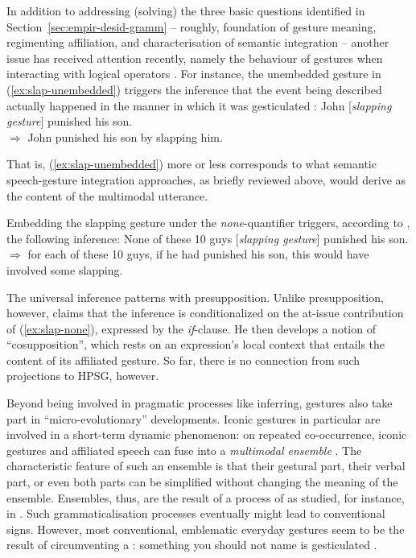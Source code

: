 \documentclass[output=paper
                ,modfonts
                ,nonflat
	        ,collection
	        ,collectionchapter
	        ,collectiontoclongg
 	        ,biblatex
                ,babelshorthands
                ,newtxmath
                ,draftmode
                ,colorlinks, citecolor=brown
]{./langsci/langscibook}
\begin{document}
In addition to addressing (solving) the three basic questions identified in Section~\ref{sec:empir-desid-gramm} -- roughly, foundation of gesture meaning, regimenting affiliation, and characterisation of semantic integration -- another issue has received attention recently, namely the  behaviour of gestures when interacting with logical operators \citep{Ebert:2014:a,Schlenker:2018}.
%
For instance, the unembedded gesture in (\ref{ex:slap-unembedded}) triggers the inference that the event being described actually happened in the manner in which it was gesticulated \citep[]{Schlenker:2018}:
%
\ea \label{ex:slap-unembedded}
John [\textit{slapping gesture}] punished his son. \\
$\Rightarrow$ John punished his son by slapping him.
\z

That is, (\ref{ex:slap-unembedded}) more or less corresponds to what semantic speech-gesture integration approaches, as briefly reviewed above, would derive as the content of the multimodal utterance.

Embedding the slapping gesture under the \textit{none}-quantifier triggers, according to \citet[]{Schlenker:2018}, the following inference:
%
\ea \label{ex:slap-none}
None of these 10 guys [\textit{slapping gesture}] punished his son. \\
$\Rightarrow$ for each of these 10 guys, if he had punished his son, this would have involved some slapping.
\z

The universal inference patterns with presupposition.
%
Unlike presupposition, however, \citet[]{Schlenker:2018} claims that the inference is conditionalized on the at-issue contribution of (\ref{ex:slap-none}), expressed by the \textit{if}-clause. 
%
He then develops a notion of \enquote{cosupposition},  which rests on an expression's local context that entails the content of its affiliated gesture.
%
So far, there is no connection from such projections to HPSG, however.


Beyond being involved in pragmatic processes like inferring, gestures also take part in \enquote{micro-evolutionary} developments.
%
Iconic gestures in particular are involved in a short-term dynamic phenomenon:
%
on repeated co-occurrence, iconic gestures and affiliated speech can fuse into a \emph{multimodal ensemble} \citep{Kendon:2004,Luecking:Mehler:Menke:2008,Mehler:Luecking:2012:d}.  
%
The characteristic feature of such an ensemble is that their gestural part, their verbal part, or even both parts can be simplified without changing the meaning of the ensemble.
%
Ensembles, thus, are the result of a process of  as studied, for instance, in  \citep{Galantucci:Garrod:2011}.
%
Such grammaticalisation processes  eventually might lead to conventional signs.
%
However, most conventional, emblematic everyday gestures seem to be the result of circumventing a : something you should not name is gesticulated \citep{Posner:2002}. 
 
\end{document}
